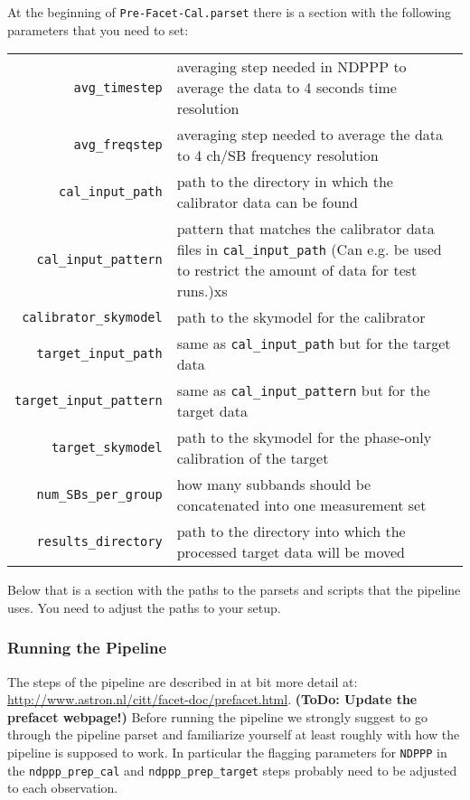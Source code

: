 
At the beginning of {\tt Pre-Facet-Cal.parset} there is a section with the following parameters that you need 
to set:\\
\begin{tabular}{rp{}}
{\tt avg\_timestep} & averaging step needed in NDPPP to average the data to 4 seconds time resolution \\
{\tt avg\_freqstep} & averaging step needed to average the data to 4 ch/SB frequency resolution \\
{\tt cal\_input\_path} & path to the directory in which the calibrator data can be found \\
{\tt cal\_input\_pattern} & pattern that matches the calibrator data files in {\tt cal\_input\_path} (Can e.g. 
  be used to restrict the amount of data for test runs.)xs \\
{\tt calibrator\_skymodel} & path to the skymodel for the calibrator \\
{\tt target\_input\_path} &  same as {\tt cal\_input\_path} but for the target data \\
{\tt target\_input\_pattern} & same as {\tt cal\_input\_pattern} but for the target data \\
{\tt target\_skymodel} & path to the skymodel for the phase-only calibration of the target \\
{\tt num\_SBs\_per\_group} & how many subbands should be concatenated into one measurement set \\
{\tt results\_directory} & path to the directory into which the processed target data will be moved \\
\end{tabular}

Below that is a section with the paths to the parsets and scripts that the pipeline uses. You need to 
adjust the paths to your setup.

\subsubsection{Running the Pipeline}

The steps of the pipeline are described in at bit more detail at: 
\url{http://www.astron.nl/citt/facet-doc/prefacet.html}. 
{\bf (ToDo: Update the prefacet webpage!)}
Before running the pipeline we strongly suggest to go through the pipeline parset and familiarize yourself
at least roughly with how the pipeline is supposed to work. 
In particular the flagging parameters for {\tt NDPPP} in the {\tt ndppp\_prep\_cal} and {\tt ndppp\_prep\_target}
steps probably need to be adjusted to each observation.

